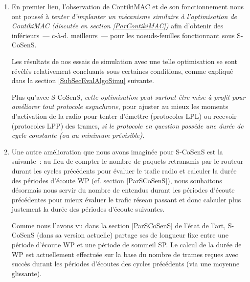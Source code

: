 \begin{enumerate}

\item En premier lieu, l'observation de ContikiMAC et de son fonctionnement
nous ont poussé à \emph{tenter d'implanter un mécanisme similaire à
l'optimisation  de ContikiMAC (discutée en section
\vref{ParContikiMAC})} afin d'obtenir des  inférieurs~---
c-à-d. meilleurs~--- pour les noeuds-feuilles fonctionnant sous S-CoSenS.

Les résultats de nos essais de simulation avec une telle optimisation se
sont révélés relativement concluants sous certaines conditions, comme
expliqué dans la section \ref{SubSecEvalAlgoSimu} suivante.

Plus qu'avec S-CoSenS, \emph{cette optimisation peut surtout être mise
à profit pour améliorer tout protocole asynchrone}, pour ajuster au mieux
les moments d'activation de la radio pour tenter d'émettre (protocoles LPL)
ou recevoir (protocoles LPP) des trames, \emph{si le protocole en question
possède une durée de cycle constante (ou au minimum prévisible).}

\smallskip

\item Une autre amélioration que nous avons imaginée pour S-CoSenS est
la suivante~: au lieu de compter le nombre de paquets retransmis par le
routeur durant les cycles précédents pour évaluer le trafic radio et
calculer la durée des périodes d'écoute WP (cf. section \vref{ParSCoSenS}),
nous souhaitons désormais nous servir du nombre de  \footnotemark[3]
entendus durant les périodes d'écoute précédentes pour mieux évaluer
le trafic réseau passant et donc calculer plus justement la durée
des périodes d'écoute suivantes.


\smallskip

Comme nous l'avons vu dans la section \vref{ParSCoSenS} de l'état de l'art,
S-CoSenS (dans sa version actuelle) partage ses  de
longueur fixe entre une période d'écoute WP et une période de sommeil SP.
Le calcul de la durée de WP est actuellement effectuée sur la base du
nombre de trames reçues avec succès durant les périodes d'écoutes des
cycles précédents (via une moyenne glissante).


\end{enumerate}
